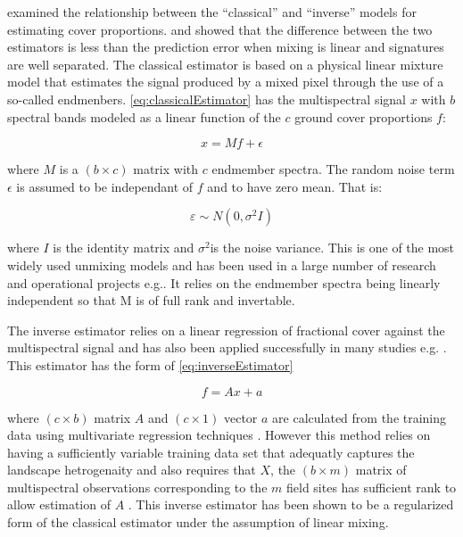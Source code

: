 \documentclass[remotesensing,article,accept,moreauthors,pdftex,12pt,a4paper]{mdpi}
\begin{document}
\citep{Settle1996} examined the relationship between the {}``classical'' and {}``inverse'' models for estimating cover proportions. and showed that the difference between the two estimators is less than the prediction error when mixing is linear and signatures are well separated. The classical estimator is based on a physical linear mixture model that estimates the signal produced by a mixed pixel through the use of a so-called endmenbers. \ref{eq:classicalEstimator} has the multispectral signal $x$ with $b$ spectral bands modeled as a linear function of the $c$ ground cover proportions $f$:

\begin{equation} x=Mf+\epsilon\label{eq:classicalEstimator}\end{equation} 

where $M$ is a $(b\times c)$ matrix with $c$ endmember spectra. The random noise term $\epsilon$ is assumed to be independant of $f$ and to have zero mean. That is:

\begin{equation} \varepsilon\sim N(0,\sigma^{2}I)\label{eq:whiteNoise}\end{equation} 

where $I$ is the identity matrix and $\sigma^{2}$is the noise variance. This is one of the most widely used unmixing models and has been used in a large number of research and operational projects e.g.\citep{Phinn2002a,Roeder2008a,Scarth2000}. It relies on the endmember spectra being linearly independent so that M is of full rank and invertable. 

The inverse estimator relies on a linear regression of fractional cover against the multispectral signal and has also been applied successfully in many studies e.g. \citep{Larsson1993,Williamson1993,Danaher2004,Fernandes2004}. This estimator has the form of \ref{eq:inverseEstimator}

\begin{equation} f=Ax+a\label{eq:inverseEstimator}\end{equation} 

where $(c\times b)$ matrix $A$ and $(c\times1)$ vector $a$ are calculated from the training data using multivariate regression techniques \citep{Kalivas1999}. However this method relies on having a sufficiently variable training data set that adequatly captures the landscape hetrogenaity \citep{Eldeiry2008,Salvador1998} and also requires that $X$, the $(b\times m)$ matrix of multispectral observations corresponding to the $m$ field sites has sufficient rank to allow estimation of $A$ \citep{Xu1998}. This inverse estimator has been shown to be a regularized form of the classical estimator under the assumption of linear mixing\citep{Settle1998}.
%
%
\end{document}
